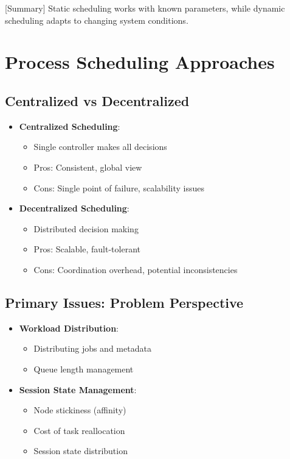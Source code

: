 \documentclass[12pt]{article}
\begin{document}
[Summary] Static scheduling works with known parameters, while dynamic scheduling adapts to changing system conditions.

\section{Process Scheduling Approaches}

\subsection{Centralized vs Decentralized}
\begin{itemize}
  \item \textbf{Centralized Scheduling}:
        \begin{itemize}
          \item Single controller makes all decisions
          \item Pros: Consistent, global view
          \item Cons: Single point of failure, scalability issues
        \end{itemize}

  \item \textbf{Decentralized Scheduling}:
        \begin{itemize}
          \item Distributed decision making
          \item Pros: Scalable, fault-tolerant
          \item Cons: Coordination overhead, potential inconsistencies
        \end{itemize}
\end{itemize}

\subsection{Primary Issues: Problem Perspective}
\begin{itemize}
  \item \textbf{Workload Distribution}:
        \begin{itemize}
          \item Distributing jobs and metadata
          \item Queue length management
        \end{itemize}

  \item \textbf{Session State Management}:
        \begin{itemize}
          \item Node stickiness (affinity)
          \item Cost of task reallocation
          \item Session state distribution
        \end{itemize}
\end{itemize}
\end{document}
